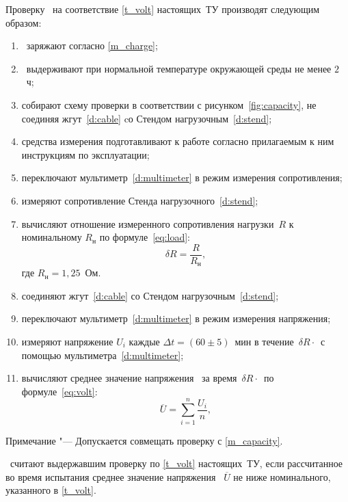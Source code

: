 Проверку \dut \ на соответствие \ref{t_volt} настоящих~ТУ производят следующим образом:
%
\begin{enumerate}
	\item \dut \ заряжают согласно \ref{m_charge};
	\item \dut \ выдерживают при нормальной температуре окружающей среды не менее $2$~ч;
	\item собирают схему проверки в соответствии с рисунком~\ref{fig:capacity}, не соединяя жгут~\ref{d:cable} cо Стендом нагрузочным~\ref{d:stend};
	\item средства измерения подготавливают к работе согласно прилагаемым к ним инструкциям по эксплуатации;
	\item переключают мультиметр~\ref{d:multimeter} в режим измерения сопротивления;
	\item измеряют сопротивление Стенда нагрузочного~\ref{d:stend};
	\item вычисляют отношение измеренного сопротивления нагрузки~$R$ к номинальному $R_{\text{н}}$ по формуле~\eqref{eq:load}:
		\begin{equation}\label{eq:load}
			\delta R = \frac{R}{R_{\text{н}}},
		\end{equation}
где $R_{\text{н}} = 1,25$~Ом.
	\item соединяют жгут~\ref{d:cable} со Стендом нагрузочным~\ref{d:stend};
	\item переключают мультиметр~\ref{d:multimeter} в режим измерения напряжения;
	\item измеряют напряжение $U_i$ каждые $\Delta t = (60 \pm 5)$~мин в течение~$\delta R\cdot$\work \ с помощью мультиметра~\ref{d:multimeter};
	\item вычисляют среднее значение напряжения \dut \ за время~$\delta R\cdot$\work \ по формуле~\eqref{eq:volt}:
		\begin{equation}\label{eq:volt}
			\overline U = \sum_{i=1}^{n} \frac{U_i}{n},
		\end{equation}
\end{enumerate}

Примечание "--- Допускается совмещать проверку с \ref{m_capacity}.

\dut \ считают выдержавшим проверку по \ref{t_volt} настоящих~ТУ, если рассчитанное во время испытания среднее значение напряжения \dut \ $\overline U$ не ниже номинального, указанного в \ref{t_volt}.